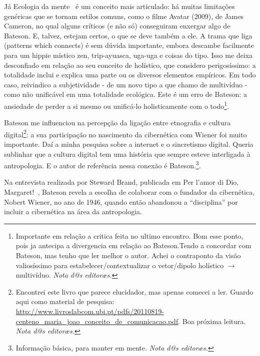 \documentclass[a4paper, 12pt]{article} %
\makeatletter
\newcommand{\ftnt}[1]{\footnote{#1 \emph{Nota d@s editoræs.}}}
\makeatother
\begin{document}
Já Ecologia da mente~\cite{b5} é um conceito mais articulado: há muitas limitações genéricas que se tornam estilos comuns, como o filme Avatar (2009), de James Cameron, no qual alguns críticos (e não só) conseguiram enxergar algo de Bateson. E, talvez, estejam certos, o que se deve também a ele. A trama que liga (patterns which connects) é sem dúvida importante, embora descambe facilmente para um hippie místico zen, trip-ayuasca, uga-uga e coisas do tipo. Isso me deixa desconfiado em relação ao seu conceito de holístico, que considero perigosíssimo: a totalidade inclui e explica uma parte ou os diversos elementos empíricos. Em todo caso, reivindico a subjetividade - de um novo tipo a que chamo de multivíduo -  como não unificável em uma totalidade ecológica. Este é um erro de Bateson: a ansiedade de perder a si mesmo ou unificá-lo holisticamente com o todo\ftnt{Importante em relação a critica feita no ultimo encontro. Bom esse ponto, pois ja antecipa a divergencia em relação ao Bateson.Tendo a concordar com Bateson, mas tenho que ler melhor o autor. Achei o contraponto da visão valiosíssimo para estabelecer/contextualizar o vetor/dipolo holístico $\rightarrow$ multivíduo.}.

Bateson me influenciou na percepção da ligação entre etnografia e cultura digital\ftnt{Encontrei este livro que parece elucidador, mas apenas comecei a ler. Guardo aqui como material de pesquisa: 
\url{http://www.livroslabcom.ubi.pt/pdfs/20110819-centeno_maria_joao_conceito_de_comunicacao.pdf}. Boa próxima leitura.}: a sua participação no nascimento da cibernética com Wiener foi muito importante. Daí a minha pesquisa sobre a internet e o sincretismo digital. Queria sublinhar que a cultura digital tem uma história que sempre esteve interligada à antropologia. E o autor de referência nessa conexão é Bateson.\ftnt{Informação básica, para manter em mente.}.

Na entrevista realizada por Steward Brand, publicada em Per l’amor di Dio, Margaret!~\cite{b6}, Bateson revela a escolha de colaborar com o fundador da cibernética, Nobert Wiener, no ano de 1946, quando então abandonou a “disciplina” por incluir a cibernética na área da antropologia. 
\end{document}
